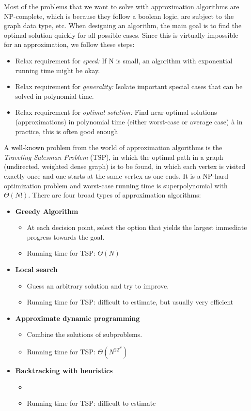 Most of the problems that we want to solve with approximation algorithms are NP-complete, which is because they follow a boolean logic, are subject to the graph data type, etc. When designing an algorithm, the main goal is to find the optimal solution quickly for all possible cases. Since this is virtually impossible for an approximation, we follow these steps:

\begin{itemize}
    \item Relax requirement for \emph{speed:} If N is small, an algorithm with exponential running time might be okay.
    \item Relax requirement for \emph{generality:} Isolate important special cases that can be solved in polynomial time.
    \item Relax requirement for \emph{optimal solution:} Find near-optimal solutions (approximations) in polynomial time (either worst-case or average case) à in practice, this is often good enough
\end{itemize}

A well-known problem from the world of approximation algorithms is the \emph{Traveling Salesman Problem} (TSP), in which the optimal path in a graph (undirected, weighted dense graph) is to be found, in which each vertex is visited exactly once and one starts at the same vertex as one ends. It is a NP-hard optimization problem and worst-case running time is superpolynomial with $\Theta(N!)$. There are four broad types of approximation algorithms:

\begin{itemize}
    \item \textbf{Greedy Algorithm}
    \begin{itemize}
        \item At each decision point, select the option that yields the largest immediate progress towards the goal.
        \item Running time for TSP: $\Theta(N)$
    \end{itemize}
    \item \textbf{Local search}
    \begin{itemize}
        \item Guess an arbitrary solution and try to improve.
        \item Running time for TSP: difficult to estimate, but usually very efficient
    \end{itemize}
    \item \textbf{Approximate dynamic programming}
    \begin{itemize}
        \item Combine the solutions of subproblems.
        \item Running time for TSP: $\Theta(N^22^N)$
    \end{itemize}
    \item \textbf{Backtracking with heuristics}
    \begin{itemize}
        \item 
        \item Running time for TSP: difficult to estimate
    \end{itemize}
\end{itemize}

